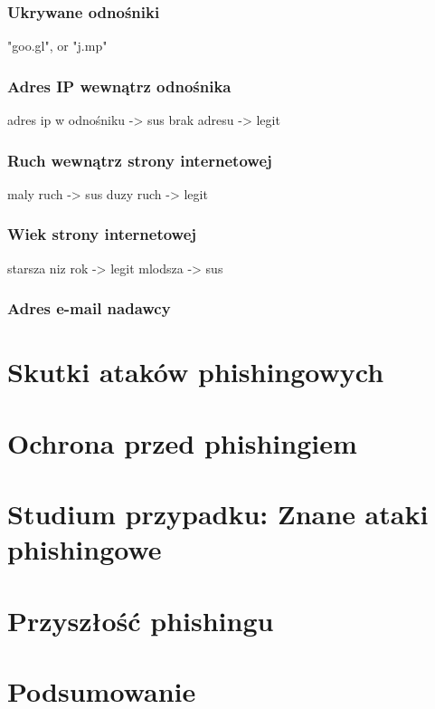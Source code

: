 \documentclass[]{article}
\begin{document}
\subsubsection{Ukrywane odnośniki}
"goo.gl", or "j.mp"

\subsubsection{Adres IP wewnątrz odnośnika}
adres ip w odnośniku -> sus
brak adresu -> legit

\subsubsection{Ruch wewnątrz strony internetowej}
maly ruch -> sus
duzy ruch -> legit

\subsubsection{Wiek strony internetowej}
starsza niz rok -> legit
mlodsza -> sus

\subsubsection{Adres e-mail nadawcy}


\section{Skutki ataków phishingowych}

\newpage
\section{Ochrona przed phishingiem}

\newpage
\section{Studium przypadku: Znane ataki phishingowe}

\newpage
\section{Przyszłość phishingu}

\newpage
\section{Podsumowanie}

\newpage


\end{document}
